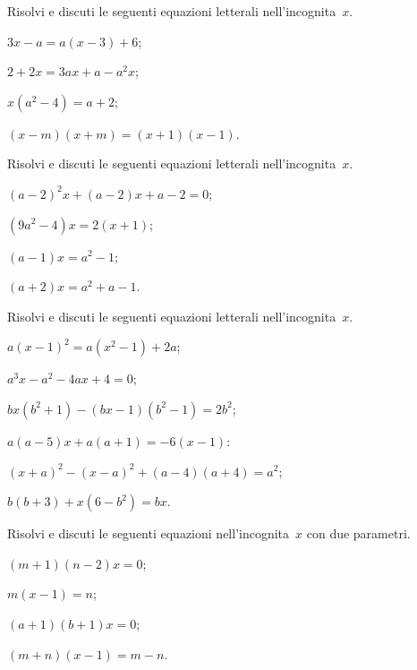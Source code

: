 \begin{esercizio}[\Ast]
\label{ese:20.38}
Risolvi e discuti le seguenti equazioni letterali nell'incognita~$x$.
\begin{multicols}{2}
\begin{enumeratea}
 \item $3x-a=a(x-3)+6$;
 \item $2+2x=3ax+a-a^{2}x$;
 \item $x(a^{2}-4)=a+2$;
 \item $(x-m)(x+m)=(x+1)(x-1)$.
\end{enumeratea}
\end{multicols}
\end{esercizio}

\begin{esercizio}[\Ast]
\label{ese:20.39}
Risolvi e discuti le seguenti equazioni letterali nell'incognita~$x$.
\begin{multicols}{2}
\begin{enumeratea}
 \item $(a-2)^{2}x+(a-2)x+a-2=0$;
 \item $\left(9a^{2}-4\right)x=2(x+1)$;
 \item $(a-1)x=a^{2}-1$;
 \item $(a+2)x=a^{2}+a-1$.
\end{enumeratea}
\end{multicols}
\end{esercizio}

\begin{esercizio}[\Ast]
\label{ese:20.40}
Risolvi e discuti le seguenti equazioni letterali nell'incognita~$x$.
\begin{multicols}{2}
\begin{enumeratea}
 \item $a(x-1)^{2}=a(x^{2}-1)+2a$;
 \item $a^{3}x-a^{2}-4ax+4=0$;
 \item $bx\left(b^{2}+1\right)-(bx-1)\left(b^{2}-1\right)=2b^{2}$;
 \item $a(a-5)x+a(a+1)=-6(x-1)$:
 \item $(x+a)^{2}-(x-a)^{2}+(a-4)(a+4)=a^{2}$;
 \item $b(b+3)+x\left(6-b^{2}\right)=bx$.
\end{enumeratea}
\end{multicols}
\end{esercizio}

\begin{esercizio}[\Ast]
\label{ese:20.41}
Risolvi e discuti le seguenti equazioni nell'incognita~$x$ con due parametri.
\begin{multicols}{2}
\begin{enumeratea}
 \item $(m+1)(n-2)x=0$;
 \item $m(x-1)=n$;
 \item $(a+1)(b+1)x=0$;
 \item $(m+n)(x-1)=m-n$.
\end{enumeratea}
\end{multicols}
\end{esercizio}

